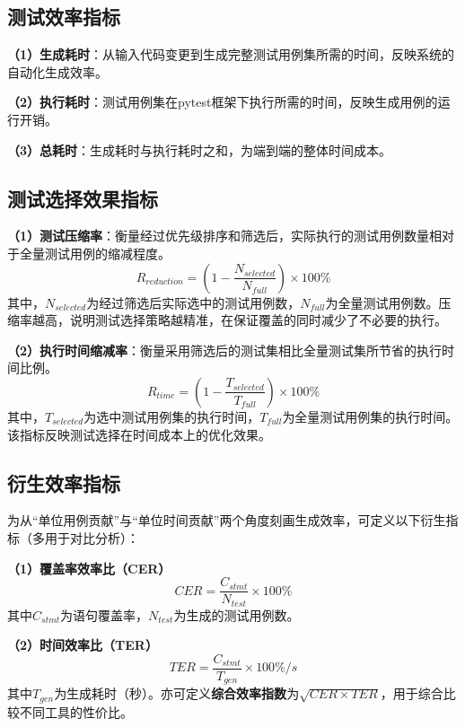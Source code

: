 \subsection{测试效率指标}
\label{ssec:efficiency_metrics}

\textbf{（1）生成耗时}：从输入代码变更到生成完整测试用例集所需的时间，反映系统的自动化生成效率。

\textbf{（2）执行耗时}：测试用例集在pytest框架下执行所需的时间，反映生成用例的运行开销。

\textbf{（3）总耗时}：生成耗时与执行耗时之和，为端到端的整体时间成本。

\subsection{测试选择效果指标}
\label{ssec:selection_metrics}

\textbf{（1）测试压缩率}：衡量经过优先级排序和筛选后，实际执行的测试用例数量相对于全量测试用例的缩减程度。
\begin{equation}
    R_{reduction} = \left(1 - \frac{N_{selected}}{N_{full}}\right) \times 100\%
\end{equation}
其中，$N_{selected}$为经过筛选后实际选中的测试用例数，$N_{full}$为全量测试用例数。压缩率越高，说明测试选择策略越精准，在保证覆盖的同时减少了不必要的执行。

\textbf{（2）执行时间缩减率}：衡量采用筛选后的测试集相比全量测试集所节省的执行时间比例。
\begin{equation}
    R_{time} = \left(1 - \frac{T_{selected}}{T_{full}}\right) \times 100\%
\end{equation}
其中，$T_{selected}$为选中测试用例集的执行时间，$T_{full}$为全量测试用例集的执行时间。该指标反映测试选择在时间成本上的优化效果。

\subsection{衍生效率指标}
\label{ssec:cer_ter_metrics}

为从``单位用例贡献''与``单位时间贡献''两个角度刻画生成效率，可定义以下衍生指标（多用于对比分析）：

\textbf{（1）覆盖率效率比（CER）}
\begin{equation}
    CER = \frac{C_{stmt}}{N_{test}} \times 100\%
\end{equation}
其中$C_{stmt}$为语句覆盖率，$N_{test}$为生成的测试用例数。

\textbf{（2）时间效率比（TER）}
\begin{equation}
    TER = \frac{C_{stmt}}{T_{gen}} \times 100\%/s
\end{equation}
其中$T_{gen}$为生成耗时（秒）。亦可定义\textbf{综合效率指数}为$\sqrt{CER \times TER}$，用于综合比较不同工具的性价比。

